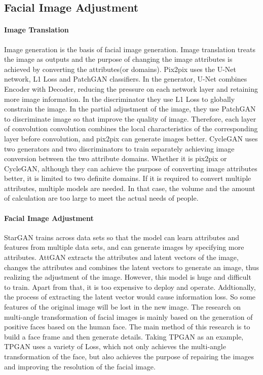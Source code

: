 \subsection{Facial Image Adjustment}

\paragraph{Image Translation}
Image generation is the basis of facial image generation.
Image translation treats the image as outputs and the purpose of changing the image attributes is achieved by converting the attributes(or domains).
Pix2pix uses the U-Net network, L1 Loss and PatchGAN classifiers.
In the generator, U-Net combines Encoder with Decoder,
    reducing the pressure on each network layer and retaining more image information.
In the discriminator they use L1 Loss to globally constrain the image.
In the partial adjustment of the image,
    they use PatchGAN to discriminate image so that improve the quality of image.
Therefore, each layer of convolution convolution combines the local characteristics of the corresponding layer before convolution,
    and pix2pix can generate images better.
CycleGAN uses two generators and two discriminators to train separately achieving image conversion between the two attribute domains.
Whether it is pix2pix or CycleGAN,
    although they can achieve the purpose of converting image attributes better,
    it is limited to two definite domains.
If it is required to convert multiple attributes, multiple models are needed.
In that case, the volume and the amount of calculation are too large to meet the actual needs of people.

\paragraph{Facial Image Adjustment}
StarGAN trains across data sets so that the model can learn attributes and features from multiple data sets,
    and can generate images by specifying more attributes.
AttGAN extracts the attributes and latent vectors of the image,
    changes the attributes and combines the latent vectors to generate an image,
    thus realizing the adjustment of the image.
However, this model is huge and difficult to train.
Apart from that, it is too expensive to deploy and operate.
Addtionally, the process of extracting the latent vector would cause information loss.
So some features of the original image will be lost in the new image.
The research on multi-angle transformation of facial images is mainly based on the generation of positive faces based on the human face.
The main method of this research is to build a face frame and then generate details.
Taking TPGAN as an example, TPGAN uses a variety of Loss,
    which not only achieves the multi-angle transformation of the face,
    but also achieves the purpose of repairing the images and improving the resolution of the facial image.

